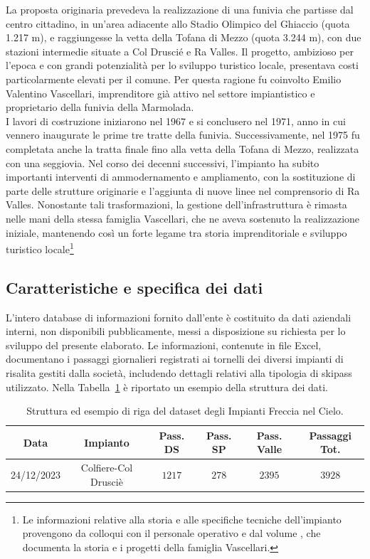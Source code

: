La proposta originaria prevedeva la realizzazione di una funivia che partisse dal centro cittadino, in un’area adiacente allo Stadio Olimpico del Ghiaccio (quota 1.217 m), e raggiungesse la vetta della Tofana di Mezzo (quota 3.244 m), con due stazioni intermedie situate a Col Druscié e Ra Valles. Il progetto, ambizioso per l’epoca e con grandi potenzialità per lo sviluppo turistico locale, presentava costi particolarmente elevati per il comune. Per questa ragione fu coinvolto Emilio Valentino Vascellari, imprenditore già attivo nel settore impiantistico e proprietario della funivia della Marmolada.\\

I lavori di costruzione iniziarono nel 1967 e si conclusero nel 1971, anno in cui vennero inaugurate le prime tre tratte della funivia. Successivamente, nel 1975 fu completata anche la tratta finale fino alla vetta della Tofana di Mezzo, realizzata con una seggiovia. Nel corso dei decenni successivi, l’impianto ha subito importanti interventi di ammodernamento e ampliamento, con la sostituzione di parte delle strutture originarie e l’aggiunta di nuove linee nel comprensorio di Ra Valles. Nonostante tali trasformazioni, la gestione dell’infrastruttura è rimasta nelle mani della stessa famiglia Vascellari, che ne aveva sostenuto la realizzazione iniziale, mantenendo così un forte legame tra storia imprenditoriale e sviluppo turistico locale\footnote{Le informazioni relative alla storia e alle specifiche tecniche dell’impianto provengono da colloqui con il personale operativo e dal volume \cite{Freccia_nel_cielo_book}, che documenta la storia e i progetti della famiglia Vascellari.}




\subsection{Caratteristiche e specifica dei dati}
L'intero database di informazioni fornito dall'ente è costituito da  dati aziendali interni, non disponibili pubblicamente, messi a disposizione su richiesta per lo sviluppo del presente elaborato.
Le informazioni, contenute in file Excel, documentano i passaggi giornalieri registrati ai  tornelli dei diversi impianti di risalita gestiti dalla società, includendo dettagli relativi alla tipologia di skipass utilizzato. Nella Tabella~\ref{tab:SpecificaImpianto} è riportato un esempio della struttura dei dati.\\

\begin{table}[h]
    \centering
    \begin{tabular}{cccccc}
        \toprule
        \textbf{Data} & \textbf{Impianto} & \textbf{Pass. DS}  & \textbf{Pass. SP} & \textbf{Pass. Valle} & \textbf{Passaggi Tot.} \\
        \midrule
        24/12/2023 & Colfiere-Col Drusciè &  $1217$ & $278$ & $2395$ & $3928$ \\
        \bottomrule
    \end{tabular}
    \caption{Struttura ed esempio di riga del dataset degli Impianti Freccia nel Cielo.}
    \label{tab:SpecificaImpianto}
\end{table}

